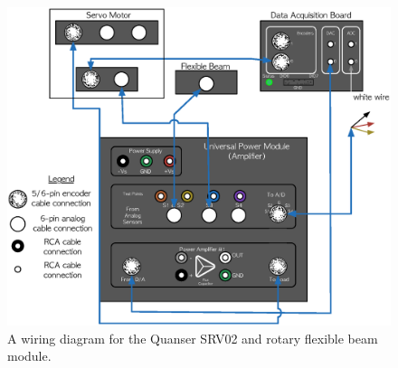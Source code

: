 \documentclass[12pt]{report}
\begin{document}
\begin{figure}[htb!]
    \centering
    \includegraphics[width=.8\linewidth]{eps/lab_1/wiring.eps}
    \caption{A wiring diagram for the Quanser SRV02 and rotary flexible beam module.}
    \label{fig:lab1_wiring}
\end{figure}
\newpage
\end{document}
